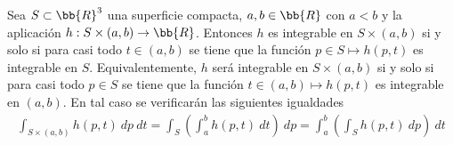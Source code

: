 \begin{teo}\label{teo:fubini_integral_sup}
        Sea $S\subset \bb{R}^3$ una superficie compacta, $a,b\in \bb{R}$ con $a<b$ y la aplicación $h:S\times (a,b)\to \bb{R}$. Entonces $h$ es integrable en $S\times (a,b)$ si y solo si para casi todo $t\in (a,b)$ se tiene que la función $p\in S \mapsto h(p,t)$ es integrable en $S$. Equivalentemente, $h$ será integrable en $S\times(a,b)$ si y solo si para casi todo $p\in S$ se tiene que la función $t\in (a,b)\mapsto h(p,t)$ es integrable en $(a,b)$. En tal caso se verificarán las siguientes igualdades 
        \begin{gather*}
            \int_{S\times(a,b)} h(p,t)\ dp\ dt = \int_S \left(\int_a^b h(p,t)\ dt\right)\ dp = \int_a^b \left(\int_{S} h(p,t)\ dp \right)\ dt
        \end{gather*}
    \end{teo}
